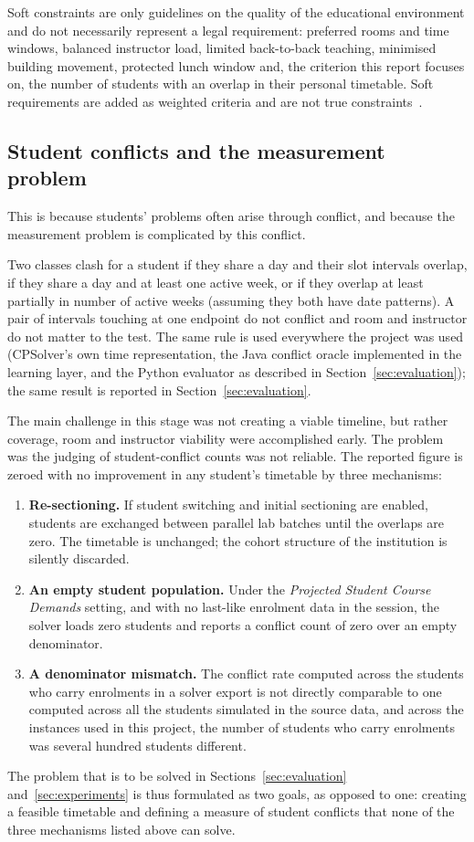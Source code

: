 Soft constraints are only guidelines on the quality of the educational environment and do not
necessarily represent a legal requirement: preferred rooms and time windows, balanced instructor
load, limited back-to-back teaching, minimised building movement, protected lunch window and, the
criterion this report focuses on, the number of students with an overlap in their personal
timetable. Soft requirements are added as weighted criteria and are not true
constraints~\cite{rudova2003soft}.

\subsection{Student conflicts and the measurement problem}

This is because students' problems often arise through conflict, and because the measurement problem
is complicated by this conflict.

Two classes clash for a student if they share a day and their slot intervals overlap, if they share
a day and at least one active week, or if they overlap at least partially in number of active weeks
(assuming they both have date patterns). A pair of intervals touching at one endpoint do not
conflict and room and instructor do not matter to the test. The same rule is used everywhere the
project was used (CPSolver's own time representation, the Java conflict oracle implemented in the
learning layer, and the Python evaluator as described in Section~\ref{sec:evaluation}); the same
result is reported in Section~\ref{sec:evaluation}.

The main challenge in this stage was not creating a viable timeline, but rather coverage, room and
instructor viability were accomplished early. The problem was the judging of student-conflict counts
was not reliable. The reported figure is zeroed with no improvement in any student's timetable by
three mechanisms:

\begin{enumerate}
  \item \textbf{Re-sectioning.} If student switching and initial sectioning are enabled, students
    are exchanged between parallel lab batches until the overlaps are zero. The timetable is
    unchanged; the cohort structure of the institution is silently discarded.
  \item \textbf{An empty student population.} Under the \emph{Projected Student Course Demands}
    setting, and with no last-like enrolment data in the session, the solver loads zero students and
    reports a conflict count of zero over an empty denominator.
  \item \textbf{A denominator mismatch.} The conflict rate computed across the students who carry
    enrolments in a solver export is not directly comparable to one computed across all the
    students simulated in the source data, and across the instances used in this project, the
    number of students who carry enrolments was several hundred students different.
\end{enumerate}

The problem that is to be solved in Sections~\ref{sec:evaluation} and~\ref{sec:experiments} is thus
formulated as two goals, as opposed to one: creating a feasible timetable and defining a measure of
student conflicts that none of the three mechanisms listed above can solve.
